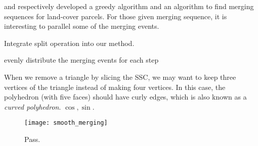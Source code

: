 \documentclass[ijgi,article,submit,moreauthors,pdftex]{Definitions/mdpi}
\begin{document}
\citet{vanOosterom2005} and \citet[]{Peng2019Thesis}
respectively developed a greedy algorithm and an \Astar algorithm to find
merging sequences for land-cover parcels.
For those given merging sequence,
it is interesting to parallel some of the merging events.

Integrate split operation into our method.

evenly distribute the merging events for each step

When we remove a triangle by slicing the SSC, 
we may want to keep three vertices of the triangle 
instead of making four vertices.
In this case, the polyhedron (with five faces) should have curly edges,
which is also known as a \emph{curved polyhedron}.
$\cos, \sin$.



\begin{figure}[tb]
\centering
\texttt{[image: smooth\_merging]}
\caption{Pass.}
\label{fig:smooth_merging_future}
\end{figure}
\end{document}
